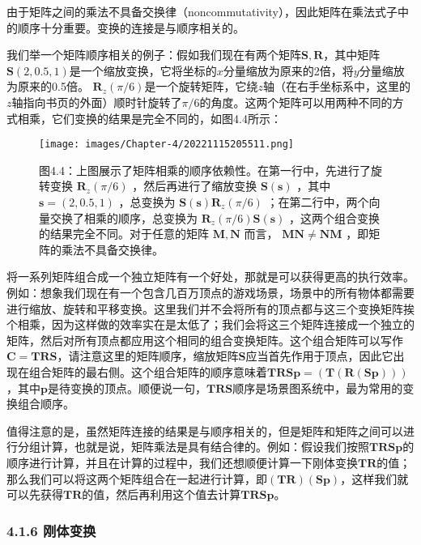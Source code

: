 \documentclass[
  paper=a4,
  ,captions=tableheading
]{scrartcl}
\begin{document}
由于矩阵之间的乘法不具备交换律（noncommutativity），因此矩阵在乘法式子中的顺序十分重要。变换的连接是与顺序相关的。

我们举一个矩阵顺序相关的例子：假如我们现在有两个矩阵\(\mathbf{S,R}\)，其中矩阵\(\mathbf{S}(2,0.5,1)\)是一个缩放变换，它将坐标的\(x\)分量缩放为原来的2倍，将\(y\)分量缩放为原来的0.5倍。 \(\mathbf{R}_z(\pi / 6)\)是一个旋转矩阵，它绕\(z\)轴（在右手坐标系中，这里的\(z\)轴指向书页的外面）顺时针旋转了\(\pi/6\)的角度。这两个矩阵可以用两种不同的方式相乘，它们变换的结果是完全不同的，如图4.4所示：

\begin{figure}
  \centering
  \texttt{[image: images/Chapter-4/20221115205511.png]}
  \caption*{图4.4：上图展示了矩阵相乘的顺序依赖性。在第一行中，先进行了旋转变换
    \(\mathbf{R}_z(\pi / 6)\) ，然后再进行了缩放变换 \(\mathbf{S(s)}\) ，其中
    \(\mathbf{s} = (2,0.5,1)\) ，总变换为 \(\mathbf{S(s)} \mathbf{R}_z(\pi / 6)\)
    ；在第二行中，两个向量交换了相乘的顺序，总变换为 \(\mathbf{R}_z(\pi / 6)
    \mathbf{S(s)}\) ，这两个组合变换的结果完全不同。对于任意的矩阵
    \(\mathbf{M,N}\) 而言， \(\mathbf{MN} \ne \mathbf{NM}\)
    ，即矩阵的乘法不具备交换律。}
\end{figure}

将一系列矩阵组合成一个独立矩阵有一个好处，那就是可以获得更高的执行效率。例如：想象我们现在有一个包含几百万顶点的游戏场景，场景中的所有物体都需要进行缩放、旋转和平移变换。这里我们并不会将所有的顶点都与这三个变换矩阵挨个相乘，因为这样做的效率实在是太低了；我们会将这三个矩阵连接成一个独立的矩阵，然后对所有顶点都应用这个相同的组合变换矩阵。这个组合矩阵可以写作\(\mathbf{C = TRS}\)，请注意这里的矩阵顺序，缩放矩阵\(\mathbf{S}\)应当首先作用于顶点，因此它出现在组合矩阵的最右侧。这个组合矩阵的顺序意味着\(\mathbf{TRSp} = \mathbf{(T(R(Sp)))}\)，其中\(\mathbf{p}\)是待变换的顶点。顺便说一句，\(\mathbf{TRS}\)顺序是场景图系统中，最为常用的变换组合顺序。

值得注意的是，虽然矩阵连接的结果是与顺序相关的，但是矩阵和矩阵之间可以进行分组计算，也就是说，矩阵乘法是具有结合律的。例如：假设我们按照\(\mathbf{TRSp}\)的顺序进行计算，并且在计算的过程中，我们还想顺便计算一下刚体变换\(\mathbf{TR}\)的值；那么我们可以将这两个矩阵组合在一起进行计算，即\(\mathbf{(TR)(Sp)}\)，这样我们就可以先获得\(\mathbf{TR}\)的值，然后再利用这个值去计算\(\mathbf{TRSp}\)。

\subsubsection{4.1.6 刚体变换}\label{ux521aux4f53ux53d8ux6362}
\end{document}
